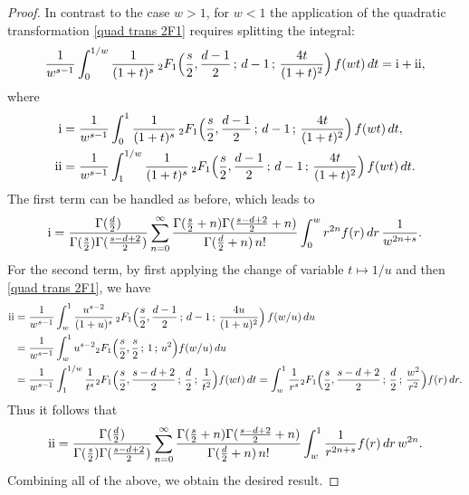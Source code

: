 \documentclass[10pt]{amsart}
\newcommand{\RN}[1]{%
	\textup{\uppercase\expandafter{\romannumeral#1}}%
}
\theoremstyle{plain}
\theoremstyle{remark}
\numberwithin{equation}{section}
\begin{document}
\begin{proof}
In contrast to the case $w>1$, for $w<1$ the application of the quadratic transformation \eqref{quad trans 2F1} requires splitting the integral:
\begin{align*}
&\quad \frac{1}{w^{s-1}}  \int_0^{1/w}  \frac{1}{(1+ t)^s}    \, {}_2F_1\Big(  \frac{s}{2}, \frac{d-1}{2} \, ; \, d-1 \, ; \,   \frac{4t}{(1+ t)^2} \Big)\, f(wt)  \,dt = \RN{1}+\RN{2},  
\end{align*}
where 
\begin{align*}
\RN{1} & =  \frac{1}{w^{s-1}}  \int_0^{1}  \frac{1}{(1+ t)^s}    \, {}_2F_1\Big(  \frac{s}{2}, \frac{d-1}{2} \, ; \, d-1 \, ; \,   \frac{4t}{(1+ t)^2} \Big)\, f(wt)  \,dt, 
\\
\RN{2} & =  \frac{1}{w^{s-1}}  \int_1^{1/w}   \frac{1}{(1+ t)^s}    \, {}_2F_1\Big(  \frac{s}{2}, \frac{d-1}{2} \, ; \, d-1 \, ; \,   \frac{4t}{(1+ t)^2} \Big)\, f(wt)  \,dt. 
\end{align*}
The first term can be handled as before, which leads to 
\begin{align*}
\RN{1} =   \frac{ \Gamma( \frac{d}{2} ) }{ \Gamma(\frac{s}{2}) \Gamma( \frac{s-d+2}{2} )  }    \sum_{n=0}^\infty \frac{ \Gamma(\frac{s}{2}+n) \Gamma( \frac{s-d+2}{2}+n )  }{ \Gamma(\frac{d}{2}+n) \, n! } \int_0^w  r^{ 2n }  f(r)\,dr\, \frac{1}{w^{2n+s}}.  
\end{align*}
For the second term, by first applying the change of variable $t \mapsto 1/u$ and then \eqref{quad trans 2F1}, we have 
\begin{align*}
\RN{2} &= \frac{1}{w^{s-1}}  \int_{w}^1  \frac{ u^{s-2} }{(1+ u)^s}    \, {}_2F_1\Big(  \frac{s}{2}, \frac{d-1}{2} \, ; \, d-1 \, ; \,   \frac{4u}{(1+ u)^2} \Big)\, f(w/u)  \,du
\\
&= \frac{1}{w^{s-1}} \int_w^1 u^{s-2}  {}_2F_1\Big(  \frac{s}{2}, \frac{s}{2} \, ; \, 1 \, ; \,   u^2 \Big)  f(w/u)\,du 
\\
&=  \frac{1}{w^{s-1}} \int_1^{1/w} \frac{1}{ t^{s} }  {}_2F_1\Big(  \frac{s}{2}, \frac{s-d+2}{2} \, ; \, \frac{d}{2} \, ; \,   \frac{1}{t^2} \Big)  f(wt)\,dt
=    \int_w^{1} \frac{ 1 }{ r^{s} }  {}_2F_1\Big(  \frac{s}{2}, \frac{s-d+2}{2} \, ; \, \frac{d}{2} \, ; \,   \frac{w^2}{r^2} \Big)  f(r)\,dr. 
\end{align*}
Thus it follows that 
\begin{align*}
\RN{2} = \frac{ \Gamma( \frac{d}{2} ) }{ \Gamma(\frac{s}{2}) \Gamma( \frac{s-d+2}{2} )  } \sum_{n=0}^\infty \frac{ \Gamma(\frac{s}{2}+n) \Gamma( \frac{s-d+2}{2}+n )  }{ \Gamma(\frac{d}{2}+n) \, n! }  \int_w^{1} \frac{1}{r^{2n+s}} f(r) \,dr \, w^{2n}. 
\end{align*}
Combining all of the above, we obtain the desired result. 
\end{proof}
\end{document}
